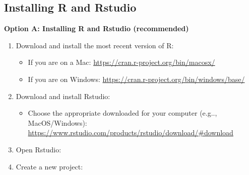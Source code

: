 \documentclass[]{book}
\providecommand{\tightlist}{%
  \setlength{\itemsep}{0pt}\setlength{\parskip}{0pt}}
\begin{document}
\hypertarget{installing-r-and-rstudio}{%
\subsection*{Installing R and Rstudio}\label{installing-r-and-rstudio}}

\textbf{Option A: Installing R and Rstudio (recommended)}

\begin{enumerate}
\def\labelenumi{\arabic{enumi}.}
\tightlist
\item
  Download and install the most recent version of R:

  \begin{itemize}
  \tightlist
  \item
    If you are on a Mac: \url{https://cran.r-project.org/bin/macosx/}
  \item
    If you are on Windows: \url{https://cran.r-project.org/bin/windows/base/}
  \end{itemize}
\item
  Download and install Rstudio:

  \begin{itemize}
  \tightlist
  \item
    Choose the appropriate downloaded for your computer (e.g.., MacOS/Windows): \url{https://www.rstudio.com/products/rstudio/download/\#download}
  \end{itemize}
\item
  Open Rstudio:
\item
  Create a new project:


\end{enumerate}
\end{document}
